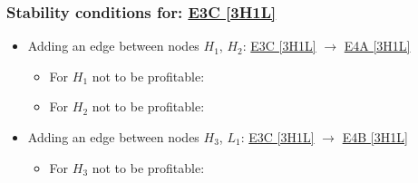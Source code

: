 

\subsubsection{Stability conditions for: \hyperref[apx:E3C:3H1L]{E3C [3H1L]}}
\label{apx:E3C:3H1L_stability_cond}

\begin{itemize}

	\item Adding an edge between nodes $H_1$, $H_2$: \hyperref[apx:E3C:3H1L]{E3C [3H1L]} $\to$ \hyperref[apx:E4A:3H1L]{E4A [3H1L]}

	\begin{itemize}

		\item For $H_1$ not to be profitable:


		\item For $H_2$ not to be profitable:


	\end{itemize}

	\item Adding an edge between nodes $H_3$, $L_1$: \hyperref[apx:E3C:3H1L]{E3C [3H1L]} $\to$ \hyperref[apx:E4B:3H1L]{E4B [3H1L]}

	\begin{itemize}

		\item For $H_3$ not to be profitable:


\end{itemize}
\end{itemize}
